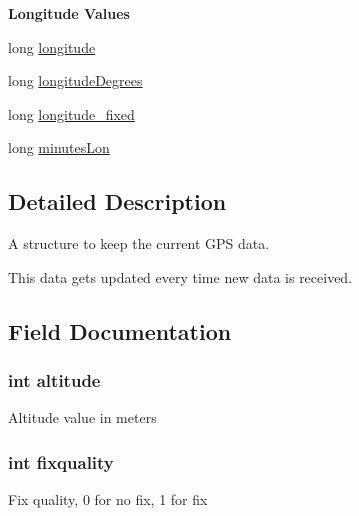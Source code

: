 \begin{Indent}{\bf Longitude Values}\par
\begin{DoxyCompactItemize}
\item 
long \hyperlink{struct_current_gps_reading_ad3da7a89e7a97e8ccb592897339bf9c1}{longitude}
\item 
long \hyperlink{struct_current_gps_reading_a945cd91f9de479289bc93bc4018e978d}{longitude\+Degrees}
\item 
long \hyperlink{struct_current_gps_reading_a98f8cd096504fecb797f338438cad86f}{longitude\+\_\+fixed}
\item 
long \hyperlink{struct_current_gps_reading_a714b41fa9a0ab79d6e1188fe2b2f5bdc}{minutes\+Lon}
\end{DoxyCompactItemize}
\end{Indent}


\subsection{Detailed Description}
A structure to keep the current G\+P\+S data. 

This data gets updated every time new data is received. 

\subsection{Field Documentation}
\hypertarget{struct_current_gps_reading_a9e54ec2d7e031746f3e5b03e7c36a28e}{}
\subsubsection[{altitude}]{\setlength{\rightskip}{0pt plus 5cm}int altitude}\label{struct_current_gps_reading_a9e54ec2d7e031746f3e5b03e7c36a28e}
Altitude value in meters \hypertarget{struct_current_gps_reading_a5fc94f0bd71207a944918191dbba4c44}{}
\subsubsection[{fixquality}]{\setlength{\rightskip}{0pt plus 5cm}int fixquality}\label{struct_current_gps_reading_a5fc94f0bd71207a944918191dbba4c44}
Fix quality, 0 for no fix, 1 for fix \hypertarget{struct_current_gps_reading_af23005df06fc3cd4264e5eee2dfa2f8c}{}
